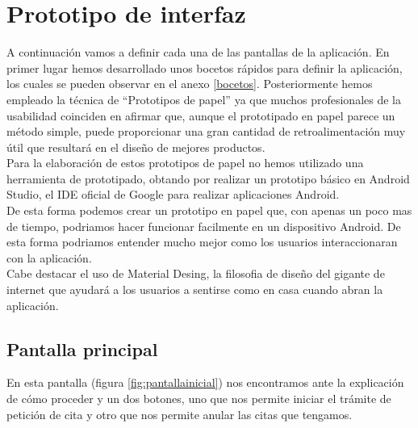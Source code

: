 \documentclass[a4paper,11pt]{article}
\begin{document}
\section{Prototipo de interfaz}
A continuación vamos a definir cada una de las pantallas de la aplicación. En primer lugar hemos desarrollado unos bocetos rápidos para definir la aplicación, los cuales se pueden observar en el anexo \ref{bocetos}. Posteriormente hemos empleado la técnica de “Prototipos de papel” ya que muchos profesionales de la usabilidad coinciden en afirmar que, aunque el prototipado en papel parece un método simple, puede proporcionar una gran cantidad de retroalimentación muy útil que resultará en el diseño de mejores productos\cite{carolyn2003retroalimentacion}.\\
Para la elaboración de estos prototipos de papel no hemos utilizado una herramienta de prototipado, obtando por realizar un prototipo básico en Android Studio\cite{androidstudio}, el IDE oficial de Google para realizar aplicaciones Android.\\
De esta forma podemos crear un prototipo en papel que, con apenas un poco mas de tiempo, podriamos hacer funcionar facilmente en un dispositivo Android. De esta forma podriamos entender mucho mejor como los usuarios interaccionaran con la aplicación.\\
Cabe destacar el uso de Material Desing\cite{materialdesing}, la filosofia de diseño del gigante de internet que ayudará a los usuarios a sentirse como en casa cuando abran la aplicación.

\subsection{Pantalla principal}
En esta pantalla (figura \ref{fig:pantallainicial}) nos encontramos ante la explicación de cómo proceder y un dos botones, uno que nos permite iniciar el trámite de petición de cita y otro que nos permite anular las citas que tengamos.
\end{document}
